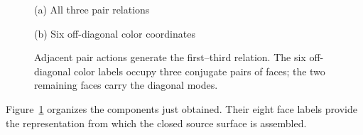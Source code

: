 \begin{figure}[!htbp]
\centering
\begin{minipage}[t]{.495\linewidth}\centering
{}\par\smallskip
\small (a) All three pair relations
\end{minipage}\hfill
\begin{minipage}[t]{.495\linewidth}\centering
{}\par\smallskip
\small (b) Six off-diagonal color coordinates
\end{minipage}
\caption{Adjacent pair actions generate the first--third relation. The six off-diagonal color labels occupy three conjugate pairs of faces; the two remaining faces carry the diagonal modes.}
\label{fig:offdiagonal}
\end{figure}

Figure~\ref{fig:offdiagonal} organizes the components just obtained. Their eight face labels provide the representation from which the closed source surface is assembled.
\FloatBarrier
